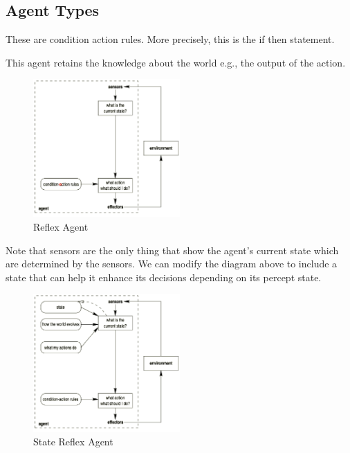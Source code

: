 \documentclass[a4paper]{article}
\theoremstyle{plain}
\theoremstyle{definition}
\newtheorem{defn}{Definition}[section]
\theoremstyle{remark}
\begin{document}
\subsection{Agent Types}
\begin{tcolorbox}[colback=black!3!white,colframe=black!60!white,title=\begin{defn}Simple Reflex Agents \label{Simple Reflex Agents}\end{defn}]
These are condition action rules. More precisely, this is the if then statement.
\end{tcolorbox}
\begin{tcolorbox}[colback=black!3!white,colframe=black!60!white,title=\begin{defn}Reflex agents with state \label{Reflex agents with state}\end{defn}]
This agent retains the knowledge about the world e.g., the output of the action. 
\begin{figure}[H]
	\centering
	\includegraphics[width=0.5\textwidth]{4.png}
	\caption{Reflex Agent}
	\label{fig:4-png}
\end{figure}
Note that sensors are the only thing that show the agent's current state which are determined by the sensors. We can modify the diagram above to include a state that can help it enhance its decisions depending on its percept state.
\begin{figure}[H]
	\centering
	\includegraphics[width=0.5\textwidth]{5.png}
	\caption{State Reflex Agent}
	\label{fig:5-png}
\end{figure}
\end{tcolorbox}
\end{document}
